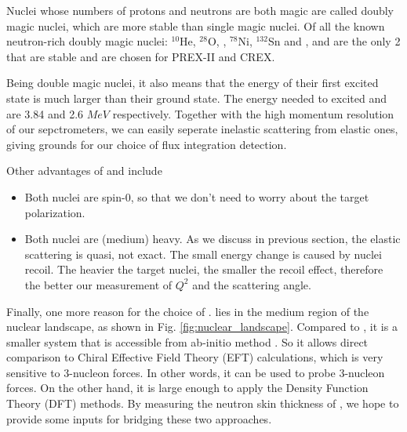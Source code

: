 Nuclei whose numbers of protons and neutrons are both magic are called doubly
magic nuclei, which are more stable than single magic nuclei. Of all the known
neutron-rich doubly magic nuclei: ${}^{10}$He, ${}^{28}$O, \Ca, ${}^{78}$Ni, 
${}^{132}$Sn and \Pb, \Ca and \Pb are the only 2 that are stable and are chosen
for PREX-II and CREX.

Being double magic nuclei, it also means that the energy of their first 
excited state is much larger than their ground state. The energy needed to
excited \Ca and \Pb are 3.84 and 2.6 $MeV$ respectively. 
Together with the high momentum resolution of our sepctrometers, we can easily
seperate inelastic scattering from elastic ones, giving grounds for our choice of
flux integration detection.

Other advantages of \Ca and \Pb include
\begin{itemize}
    \item Both nuclei are spin-0, so that we don't need to worry about the target polarization.
    \item Both nuclei are (medium) heavy. As we discuss in previous section, 
	the elastic scattering is quasi, not exact. The small energy change is 
	caused by nuclei recoil. The heavier the target nuclei, the smaller the 
	recoil effect, therefore the better our measurement of $Q^2$ and the 
	scattering angle.
\end{itemize}

Finally, one more reason for the choice of \Ca. \Ca lies in the medium region of the nuclear 
landscape, as shown in Fig. \ref{fig:nuclear_landscape}. Compared to \Pb, it
is a smaller system that is accessible from ab-initio method \cite{Hagen2016}.
So it allows direct comparison to Chiral Effective Field Theory (EFT) calculations,
which is very sensitive to 3-nucleon forces. In other words, it can be used
to probe 3-nucleon forces. On the other hand, it is large enough to apply the
Density Function Theory (DFT) methods. By measuring the neutron skin thickness of \Ca, 
we hope to provide some inputs for bridging these two approaches. 
